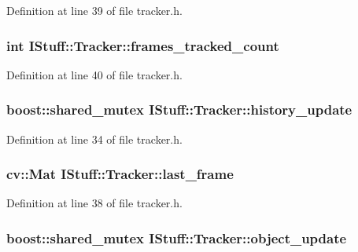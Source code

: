 Definition at line 39 of file tracker.\-h.

\hypertarget{class_i_stuff_1_1_tracker_a4b61344f6dea5d440399261c8d037415}{
\subsubsection[{frames\-\_\-tracked\-\_\-count}]{\setlength{\rightskip}{0pt plus 5cm}int I\-Stuff\-::\-Tracker\-::frames\-\_\-tracked\-\_\-count\hspace{0.3cm}{\ttfamily [private]}}}\label{class_i_stuff_1_1_tracker_a4b61344f6dea5d440399261c8d037415}


Definition at line 40 of file tracker.\-h.

\hypertarget{class_i_stuff_1_1_tracker_a7d60cb5e6f1102906ad0f3653df0f14b}{
\subsubsection[{history\-\_\-update}]{\setlength{\rightskip}{0pt plus 5cm}boost\-::shared\-\_\-mutex I\-Stuff\-::\-Tracker\-::history\-\_\-update\hspace{0.3cm}{\ttfamily [private]}}}\label{class_i_stuff_1_1_tracker_a7d60cb5e6f1102906ad0f3653df0f14b}


Definition at line 34 of file tracker.\-h.

\hypertarget{class_i_stuff_1_1_tracker_a656020d6fe4cac1807961417192aaacb}{
\subsubsection[{last\-\_\-frame}]{\setlength{\rightskip}{0pt plus 5cm}cv\-::\-Mat I\-Stuff\-::\-Tracker\-::last\-\_\-frame\hspace{0.3cm}{\ttfamily [private]}}}\label{class_i_stuff_1_1_tracker_a656020d6fe4cac1807961417192aaacb}


Definition at line 38 of file tracker.\-h.

\hypertarget{class_i_stuff_1_1_tracker_a395a42f0c4888461053315b24f9c7892}{
\subsubsection[{object\-\_\-update}]{\setlength{\rightskip}{0pt plus 5cm}boost\-::shared\-\_\-mutex I\-Stuff\-::\-Tracker\-::object\-\_\-update\hspace{0.3cm}{\ttfamily [private]}}}\label{class_i_stuff_1_1_tracker_a395a42f0c4888461053315b24f9c7892}


